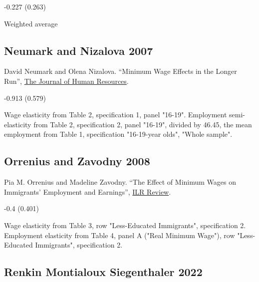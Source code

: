 \vspace{0.7em}

 -0.227 (0.263)

\vspace{0.7em}

 Weighted average

\subsection*{Neumark and Nizalova 2007}
\vspace{-0.7em}

\noindent David Neumark and Olena Nizalova. ``Minimum Wage Effects in the Longer Run'', \href{https://doi.org/10.3368/jhr.XLII.2.435}{The Journal of Human Resources}.

\vspace{0.7em}

 -0.913 (0.579)

\vspace{0.7em}

 Wage elasticity from Table 2, specification 1, panel "16-19". Employment semi-elasticity from Table 2, specification 2, panel "16-19", divided by 46.45, the mean employment from Table 1, specification "16-19-year olds", "Whole sample".

\subsection*{Orrenius and Zavodny 2008}
\vspace{-0.7em}

\noindent Pia M. Orrenius and Madeline Zavodny. ``The Effect of Minimum Wages on Immigrants' Employment and Earnings'', \href{https://doi.org/10.1177/001979390806100406}{ILR Review}.

\vspace{0.7em}

 -0.4 (0.401)

\vspace{0.7em}

 Wage elasticity from Table 3, row "Less-Educated Immigrants", specification 2. Employment elasticity from Table 4, panel A ("Real Minimum Wage"), row "Less-Educated Immigrants", specification 2.

\subsection*{Renkin Montialoux Siegenthaler 2022}
\vspace{-0.7em}

